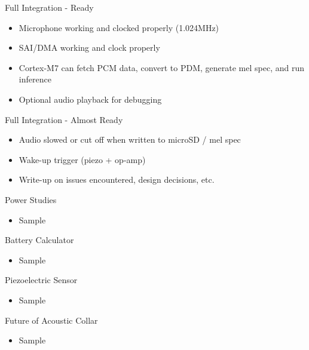 \begin{frame}{Full Integration - Ready}
    \begin{itemize}
        \item Microphone working and clocked properly (1.024MHz)
        \item SAI/DMA working and clock properly
        \item Cortex-M7 can fetch PCM data, convert to PDM, generate mel spec, and run inference
        \item Optional audio playback for debugging
    \end{itemize}
\end{frame}

\begin{frame}{Full Integration - Almost Ready}
    \begin{itemize}
        \item Audio slowed or cut off when written to microSD / mel spec
        \item Wake-up trigger (piezo + op-amp)
        \item Write-up on issues encountered, design decisions, etc.
    \end{itemize}
\end{frame}

\begin{frame}{Power Studies}
    \begin{itemize}
        \item Sample
    \end{itemize}
\end{frame}

\begin{frame}{Battery Calculator}
    \begin{itemize}
        \item Sample
    \end{itemize}
\end{frame}

\begin{frame}{Piezoelectric Sensor}
    \begin{itemize}
        \item Sample
    \end{itemize}
\end{frame}

\begin{frame}{Future of Acoustic Collar}
    \begin{itemize}
        \item Sample
    \end{itemize}
\end{frame}

